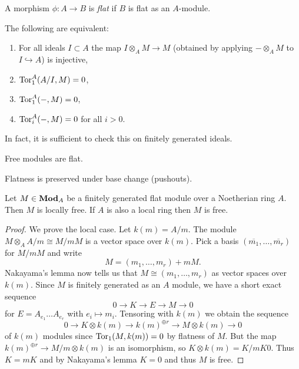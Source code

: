 \begin{definition}
\label{def:flatmap}
	A morphism $\phi: A \to B$ is \emph{flat} if $B$ is flat as an $A$-module.
\end{definition}

\begin{proposition}
	The following are equivalent: 
	\begin{enumerate}
    	\item For all ideals $I \subset A$ the map $I \otimes_A M \to M$ (obtained by applying $-\otimes_A M$ to $I \hookrightarrow A$) is injective,
		\item $\operatorname{Tor}^A_1(A/I, M) = 0$,
		\item $\operatorname{Tor}^A_1(-, M) = 0$,
		\item $\operatorname{Tor}^{A}_i(-, M) = 0$ for all $i > 0$. 
    \end{enumerate}
\end{proposition}
In fact, it is sufficient to check this on finitely generated ideals.

\begin{example}\label{ex:free-flat}
	Free modules are flat.
\end{example}
\begin{proposition}\label{prop:flatness-base-change}
	Flatness is preserved under base change (pushouts).
\end{proposition}
\begin{proposition}\label{prop:flat-over-noeth-loc-free}
	Let $M \in \mathbf{Mod}_A$ be a finitely generated flat module over a Noetherian ring $A$. Then $M$ is locally free. If $A$ is also a local ring then $M$ is free. 
\end{proposition}
\begin{proof}
	We prove the local case. Let $k(m) = A/m$. The module $M \otimes_A A/m \cong M/mM $ is a vector space over $k(m)$. Pick a basis $(\overline{m_1}, \dots, \overline{m_r})$ for $M/mM$ and write 
	\[
    	M = (m_1, \dots, m_r) + mM.
    \] Nakayama's lemma now tells us that $M \cong (m_1, \dots, m_r)$ as vector spaces over $k(m)$. 
	Since $M$ is finitely generated as an $A$ module, we have a short exact sequence \[
    	0 \to K \to E \to M \to 0
    \] for $E = A_{e_1} \dots A_{e_r}$ with $e_i \mapsto m_i$.
	Tensoring with $k(m)$ we obtain the sequence \[
    	0 \to K \otimes k(m) \to k(m)^{\oplus r} \to M \otimes k(m) \to 0
    \] of $k(m)$ modules since $\operatorname{Tor}_1(M, k(m)) = 0$ by flatness of $M$.
	 But the map $k(m)^{\oplus r} \to M/m \otimes k(m)$ is an isomorphism, so $K \otimes k(m) = K / mK 0$. Thus $K = mK$ and by Nakayama's lemma $K = 0$ and thus $M$ is free.
\end{proof}

